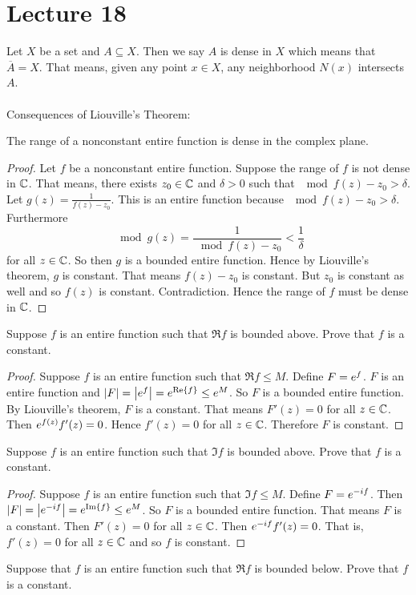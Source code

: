 \documentclass[12pt]{article}
\begin{document}
\section{Lecture 18}
Let $X$ be a set and $A \subseteq X$. Then we say $A$ is dense in $X$ which means that $\overline{A} = X$. That means, given any point $x \in X$, any neighborhood $N(x)$ intersects $A$. \\~\\
Consequences of Liouville's Theorem: 
\begin{theorem} The range of a nonconstant entire function is dense in the complex plane. \end{theorem} 
\begin{proof} Let $f$ be a nonconstant entire function. Suppose the range of $f$ is not dense in $\mathbb{C}$. That means, there exists $z_0 \in \mathbb{C}$ and $\delta > 0$ such that $\mod{f(z) - z_0} > \delta$. Let $g(z) = \frac{1}{f(z) - z_0}$. This is an entire function because $\mod{f(z) - z_0} > \delta$. Furthermore $$\mod{g(z)} = \frac{1}{\mod{f(z) - z_0}} < \frac{1}{\delta} $$ for all $z\in\mathbb{C}$. So then $g$ is a bounded entire function. Hence by Liouville's theorem, $g$ is constant. That means $f(z) - z_0$ is constant. But $z_0$ is constant as well and so $f(z)$ is constant. Contradiction. Hence the range of $f$ must be dense in $\mathbb{C}$. \end{proof} 
Suppose $f$ is an entire function such that $\Re{f}$ is bounded above. Prove that $f$ is a constant. 
\begin{proof} Suppose $f$ is an entire function such that $\Re{f} \leq M$. Define $F = e^{f}$. $F$ is an entire function and $\abs{F} = \abs{e^{f}} = e^{\Re{f}} \leq e^{M}$. So $F$ is a bounded entire function. By Liouville's theorem, $F$ is a constant. That means $F'(z) = 0$ for all $z \in \mathbb{C}$. Then $e^{f(z)}f'(z) = 0$. Hence $f'(z) = 0$ for all $z \in \mathbb{C}$. Therefore $F$ is constant. \end{proof} 
Suppose $f$ is an entire function such that $\Im{f}$ is bounded above. Prove that $f$ is a constant. 
\begin{proof} Suppose $f$ is an entire function such that $\Im{f} \leq M$. Define $F = e^{-if}$. Then $\abs{F} = \abs{e^{-if}} = e^{\Im{f}} \leq e^{M}$. So $F$ is a bounded entire function. That means $F$ is a constant. Then $F'(z) = 0$ for all $z \in \mathbb{C}$. Then $e^{-if}f'(z) = 0$. That is, $f'(z) = 0$ for all $z \in \mathbb{C}$ and so $f$ is constant. \end{proof} 
Suppose that $f$ is an entire function such that $\Re{f}$ is bounded below. Prove that $f$ is a constant. 
\end{document}
